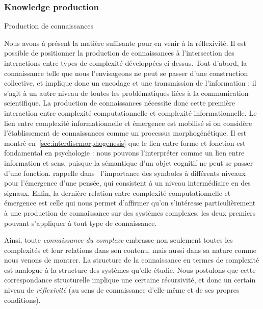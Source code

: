 \subsubsection{Knowledge production}{Production de connaissances}

Nous avons à présent la matière suffisante pour en venir à la réflexivité. Il est possible de positionner la production de connaissances à l'intersection des interactions entre types de complexité développées ci-dessus. Tout d'abord, la connaissance telle que nous l'envisageons ne peut se passer d'une construction collective, et implique donc un encodage et une transmission de l'information : il s'agit à un autre niveau de toutes les problématiques liées à la communication scientifique. La production de connaissances nécessite donc cette première interaction entre complexité computationnelle et complexité informationnelle. Le lien entre complexité informationnelle et émergence est mobilisé si on considère l'établissement de connaissances comme un processus morphogénétique. Il est montré en~\ref{sec:interdiscmorphogenesis} que le lien entre forme et fonction est fondamental en psychologie : nous pouvons l'interpréter comme un lien entre information et sens, puisque la sémantique d'un objet cognitif ne peut se passer d'une fonction.  rappelle dans~\cite{hofstadter1980godel} l'importance des symboles à différents niveaux pour l'émergence d'une pensée, qui consistent à un niveau intermédiaire en des signaux. Enfin, la dernière relation entre complexité computationnelle et émergence est celle qui nous permet d'affirmer qu'on s'intéresse particulièrement à une production de connaissance sur des systèmes complexes, les deux premiers pouvant s'appliquer à tout type de connaissance.

Ainsi, toute \emph{connaissance du complexe} embrasse non seulement toutes les complexités et leur relations dans son contenu, mais aussi dans sa nature comme nous venons de montrer. La structure de la connaissance en termes de complexité est analogue à la structure des systèmes qu'elle étudie. Nous postulons que cette correspondance structurelle implique une certaine récursivité, et donc un certain niveau de \emph{réflexivité} (au sens de connaissance d'elle-même et de ses propres conditions). 



